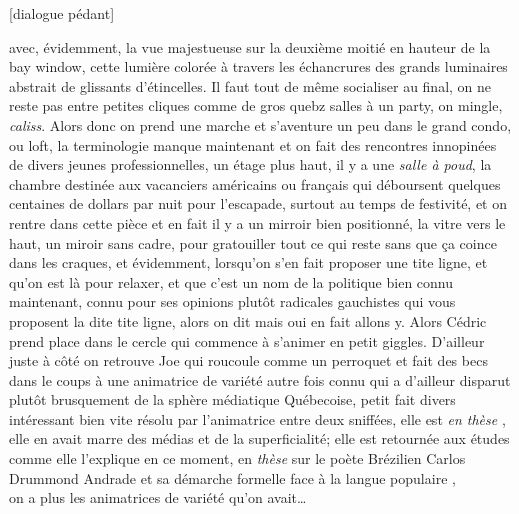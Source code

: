 [dialogue pédant] 


avec, évidemment, la vue majestueuse sur la deuxième moitié en hauteur de la
bay window, cette lumière colorée à travers les échancrures des grands
luminaires abstrait de glissants d'étincelles.
Il faut tout de même socialiser au final, on ne reste pas entre petites cliques
comme de gros quebz salles à un party, on mingle, \emph{caliss}. Alors
donc on prend une marche et s'aventure un peu dans le grand condo, ou loft,
la terminologie manque maintenant et on fait des rencontres innopinées de divers
jeunes professionnelles, un étage plus haut, il y a une \emph{salle à poud}, la
chambre destinée aux vacanciers américains ou français qui déboursent quelques
centaines de dollars par nuit pour l'escapade, surtout au temps de festivité, 
et on rentre dans cette pièce et en fait il y a un mirroir bien positionné, la vitre vers le
haut, un miroir sans cadre, pour gratouiller tout ce qui reste sans que ça coince dans les
craques, et évidemment, lorsqu'on s'en fait proposer une tite ligne, et qu'on est là pour
relaxer, et que c'est un nom de la politique bien connu maintenant, connu pour ses 
opinions plutôt radicales gauchistes qui vous proposent la dite tite ligne, 
alors on dit mais oui en fait allons y. Alors Cédric prend place dans le cercle
qui commence à s'animer en petit giggles. D'ailleur juste à côté on retrouve Joe qui 
roucoule comme un perroquet et fait des becs dans le coups à une animatrice de variété
autre fois connu qui a d'ailleur disparut plutôt brusquement de la sphère médiatique
Québecoise, petit fait divers intéressant bien vite résolu par l'animatrice entre
deux sniffées, elle est \emph{en thèse} , elle en avait marre des médias et de la
superficialité; elle est retournée aux études comme elle l'explique en ce moment, en \emph{thèse} sur
le poète Brézilien Carlos Drummond Andrade et sa démarche formelle face à la langue populaire
, \\
on a plus les animatrices de variété qu'on avait\ldots\newpage

